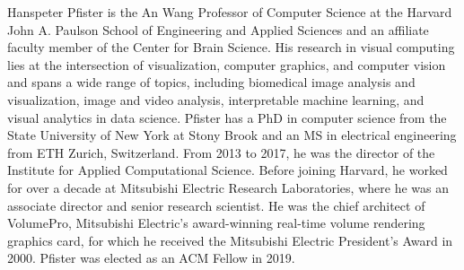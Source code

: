 \documentclass[10pt,journal,compsoc]{IEEEtran}
\begin{document}
\begin{IEEEbiography}{Hanspeter Pfister}
is the An Wang Professor of Computer Science at the Harvard John A. Paulson School of Engineering and Applied Sciences and an affiliate faculty member of the Center for Brain Science. His research in visual computing lies at the intersection of visualization, computer graphics, and computer vision and spans a wide range of topics, including biomedical image analysis and visualization, image and video analysis, interpretable machine learning, and visual analytics in data science. Pfister has a PhD in computer science from the State University of New York at Stony Brook and an MS in electrical engineering from ETH Zurich, Switzerland. From 2013 to 2017, he was the director of the Institute for Applied Computational Science. 
Before joining Harvard, he worked for over a decade at Mitsubishi Electric Research Laboratories, where he was an associate director and senior research scientist. 
He was the chief architect of VolumePro, Mitsubishi Electric’s award-winning real-time volume rendering graphics card, for which he received the Mitsubishi Electric President’s Award in 2000. Pfister was elected as an ACM Fellow in 2019. 
\end{IEEEbiography}
\end{document}
